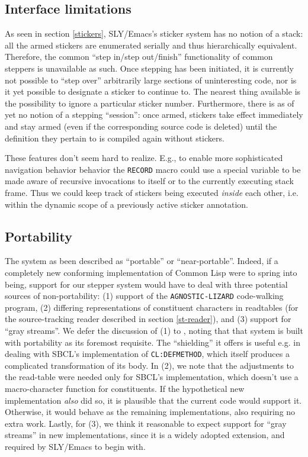 \documentclass[format=sigconf]{acmart}
\begin{document}
\subsection{Interface limitations}

As seen in section \ref{stickers}, SLY/Emacs's sticker system has no
notion of a stack: all the armed stickers are enumerated serially and
thus hierarchically equivalent.  Therefore, the common ``step in/step
out/finish'' functionality of common steppers is unavailable as such.
Once stepping has been initiated, it is currently not possible to
``step over'' arbitrarily large sections of uninteresting code, nor is
it yet possible to designate a sticker to continue to.  The nearest
thing available is the possibility to ignore a particular sticker
number.  Furthermore, there is as of yet no notion of a stepping
``session'': once armed, stickers take effect immediately and stay
armed (even if the corresponding source code is deleted) until the
definition they pertain to is compiled again without stickers.

These features don't seem hard to realize.  E.g., to enable more
sophisticated navigation behavior behavior the \texttt{RECORD} macro
could use a special variable to be made aware of recursive invocations
to itself or to the currently executing stack frame.  Thus we could
keep track of stickers being executed \emph{inside} each other,
i.e. within the dynamic scope of a previously active sticker
annotation.

\subsection{Portability}

The system as been described as ``portable'' or ``near-portable''.
Indeed, if a completely new conforming implementation of Common Lisp
were to spring into being, support for our stepper system would have
to deal with three potential sources of non-portability: (1) support
of the \texttt{AGNOSTIC-LIZARD} code-walking program, (2) differing
representations of constituent characters in readtables (for the
source-tracking reader described in section \ref{st-reader}), and (3)
support for ``gray streams''.  We defer the discussion of (1) to
\cite{agnostic-lizard}, noting that that system is built with
portability as its foremost requisite.  The ``shielding'' it offers is
useful e.g. in dealing with SBCL's implementation of
\texttt{CL:DEFMETHOD}, which itself produces a complicated
transformation of its body.  In (2), we note that the adjustments to
the read-table were needed only for SBCL's implementation, which
doesn't use a macro-character function for constituents.  If the
hypothetical new implementation \emph{also} did so, it is plausible
that the current code would support it.  Otherwise, it would behave as
the remaining implementations, also requiring no extra work.  Lastly,
for (3), we think it reasonable to expect support for ``gray streams''
in new implementations, since it is a widely adopted extension, and
required by SLY/Emacs to begin with.
\end{document}
